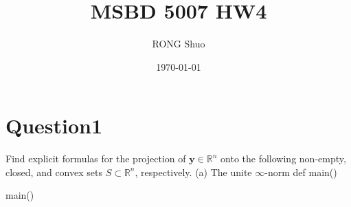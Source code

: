 \documentclass{article}
\title{MSBD 5007 HW4}
\author{RONG Shuo}
\date{\today}
\newcommand{\R}{\mathbb{R}}
\begin{document}
\maketitle

\section*{Question1}
Find explicit formulas for the projection of \(\bm{y} \in \R^n\) onto the following non-empty, closed, and convex sets \(S \subset \R^n\), respectively.
(a) The unite \(\infty\)-norm
def main() {

}
main()
\end{document}
